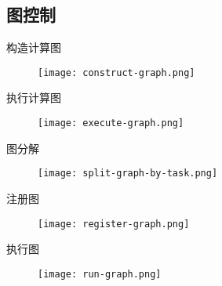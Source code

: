 \subsection{图控制}

\begin{frame}{构造计算图}
  \begin{figure}
    \centering
    \texttt{[image: construct-graph.png]}
  \end{figure}
\end{frame}

\begin{frame}{执行计算图}
  \begin{figure}
    \centering
    \texttt{[image: execute-graph.png]}
  \end{figure}
\end{frame}

\begin{frame}{图分解}
  \begin{figure}
    \centering
    \texttt{[image: split-graph-by-task.png]}
  \end{figure}
\end{frame}

\begin{frame}{注册图}
  \begin{figure}
    \centering
    \texttt{[image: register-graph.png]}
  \end{figure}
\end{frame}

\begin{frame}{执行图}
  \begin{figure}
    \centering
    \texttt{[image: run-graph.png]}
  \end{figure}
\end{frame}

